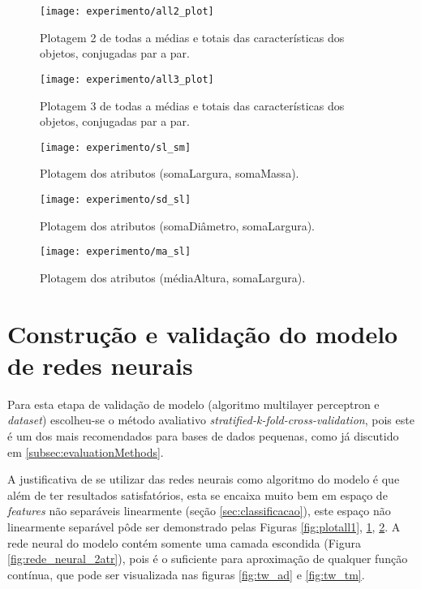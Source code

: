 \begin{figure}[!htb] \centering 
  \centering
  \texttt{[image: experimento/all2\_plot]} 
  \caption{Plotagem 2 de todas a médias e totais das características dos objetos, conjugadas par a par.} 
  \label{fig:plotall2}
\end{figure}

\begin{figure}[!htb] \centering 
  \centering
  \texttt{[image: experimento/all3\_plot]} 
  \caption{Plotagem 3 de todas a médias e totais das características dos objetos, conjugadas par a par.} 
  \label{fig:plotall3}
\end{figure}

\begin{figure}[!htb] \centering 
  \centering
  \texttt{[image: experimento/sl\_sm]} 
  \caption{Plotagem dos atributos (somaLargura, somaMassa). } 
  \label{fig:sl_sm}
\end{figure}

\begin{figure}[!htb] \centering 
  \centering
  \texttt{[image: experimento/sd\_sl]} 
  \caption{Plotagem dos atributos (somaDiâmetro, somaLargura). } 
  \label{fig:sd_sl}
\end{figure}

\begin{figure}[!htb] \centering 
  \centering
  \texttt{[image: experimento/ma\_sl]} 
  \caption{Plotagem dos atributos (médiaAltura, somaLargura). } 
  \label{fig:ma_sl}
\end{figure}

\section{Construção e validação do modelo de redes neurais}
Para esta etapa de validação de modelo (algoritmo multilayer perceptron e \textit{dataset}) escolheu-se o método avaliativo \textit{stratified-k-fold-cross-validation}, pois este é um dos mais recomendados para bases de dados pequenas, como já discutido em \ref{subsec:evaluationMethods}. 

A justificativa de se utilizar das redes neurais como algoritmo do modelo é que além de ter resultados satisfatórios, esta se encaixa muito bem em espaço de \textit{features} não separáveis linearmente (seção \ref{sec:classificacao}), este espaço não linearmente separável pôde ser demonstrado pelas Figuras \ref{fig:plotall1}, \ref{fig:plotall2}, \ref{fig:plotall3}. A rede neural do modelo contém somente uma camada escondida (Figura \ref{fig:rede_neural_2atr}), pois é o suficiente para aproximação de qualquer função contínua\cite{Pasini:2015}, que pode ser visualizada nas figuras \ref{fig:tw_ad} e \ref{fig:tw_tm}.

